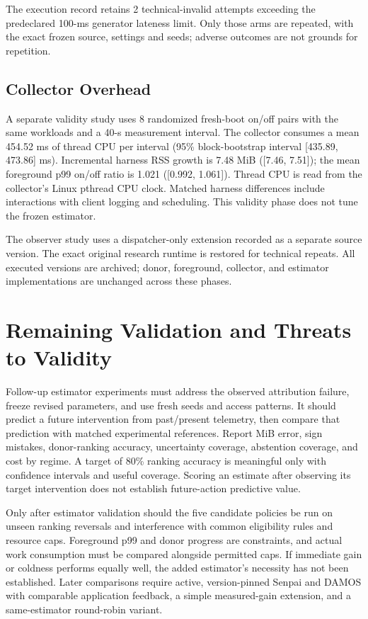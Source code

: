 \documentclass[conference]{IEEEtran}
\begin{document}
The execution record retains 2 technical-invalid attempts exceeding the predeclared 100-ms generator lateness limit. Only those arms are repeated, with the exact frozen source, settings and seeds; adverse outcomes are not grounds for repetition.

\subsection{Collector Overhead}
A separate validity study uses 8 randomized fresh-boot on/off pairs with the same workloads and a 40-s measurement interval. The collector consumes a mean 454.52 ms of thread CPU per interval (95\% block-bootstrap interval [435.89, 473.86] ms). Incremental harness RSS growth is 7.48 MiB ([7.46, 7.51]); the mean foreground p99 on/off ratio is 1.021 ([0.992, 1.061]). Thread CPU is read from the collector's Linux pthread CPU clock. Matched harness differences include interactions with client logging and scheduling. This validity phase does not tune the frozen estimator.

The observer study uses a dispatcher-only extension recorded as a separate source version. The exact original research runtime is restored for technical repeats. All executed versions are archived; donor, foreground, collector, and estimator implementations are unchanged across these phases.


\section{Remaining Validation and Threats to Validity}
Follow-up estimator experiments must address the observed attribution failure,
freeze revised parameters, and use fresh seeds and access patterns. It should predict a future intervention from
past/present telemetry, then compare that prediction with matched experimental
references. Report MiB error, sign mistakes, donor-ranking accuracy, uncertainty
coverage, abstention coverage, and cost by regime. A target of 80\% ranking
accuracy is meaningful only with confidence intervals and useful coverage.
Scoring an estimate after observing its target intervention does not establish
future-action predictive value.

Only after estimator validation should the five candidate policies be run on
unseen ranking reversals and interference with common eligibility rules and
resource caps. Foreground p99 and donor progress are constraints, and actual
work consumption must be compared alongside permitted caps. If immediate gain
or coldness performs equally well, the added estimator's necessity has not been
established. Later comparisons require active, version-pinned Senpai and DAMOS
with comparable application feedback, a simple measured-gain extension, and a
same-estimator round-robin variant.
\end{document}
